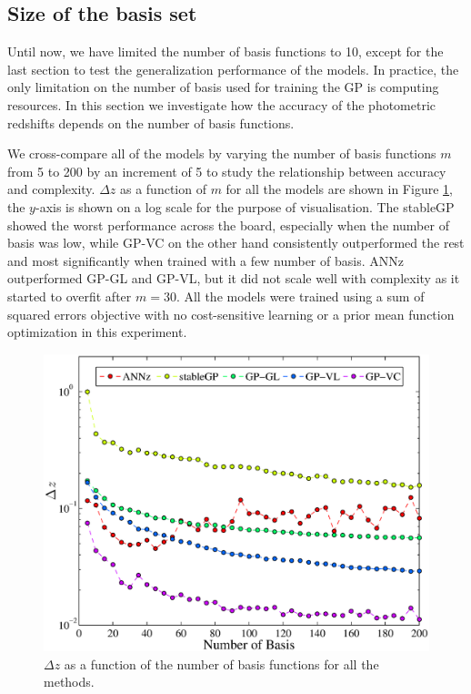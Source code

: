 \documentclass[useAMS,usenatbib,fleqn]{mn2e}
\begin{document}
\subsection{Size of the basis set}

Until now, we have limited the number of basis functions to 10, except for the last section to test the generalization performance of the models. In practice, the only limitation on the number of basis used for training the GP is computing resources. In this section we investigate how the accuracy of the photometric redshifts depends on the number of basis functions.

We cross-compare all of the models by varying the number of basis functions $m$ from 5 to 200 by an increment of 5 to study the relationship between accuracy and complexity. $\Delta z$ as a function of $m$ for all the models are shown in Figure \ref{fig-rmses}, the $y$-axis is shown on a log scale for the purpose of visualisation. The {\sc stableGP} showed the worst performance across the board, especially when the number of basis was low, while GP-VC on the other hand consistently outperformed the rest and most significantly when trained with a few number of basis. {\sc ANNz} outperformed GP-GL and GP-VL, but it did not scale well with complexity as it started to overfit after $m=30$. All the models were trained using a sum of squared errors objective with no cost-sensitive learning or a prior mean function optimization in this experiment. 

\begin{figure}
	\centering
	\includegraphics[width=\columnwidth]{figures/different-basis.eps}
	\caption{$\Delta z$ as a function of the number of basis functions for all the methods.}
	\label{fig-rmses}
\end{figure}
\end{document}
